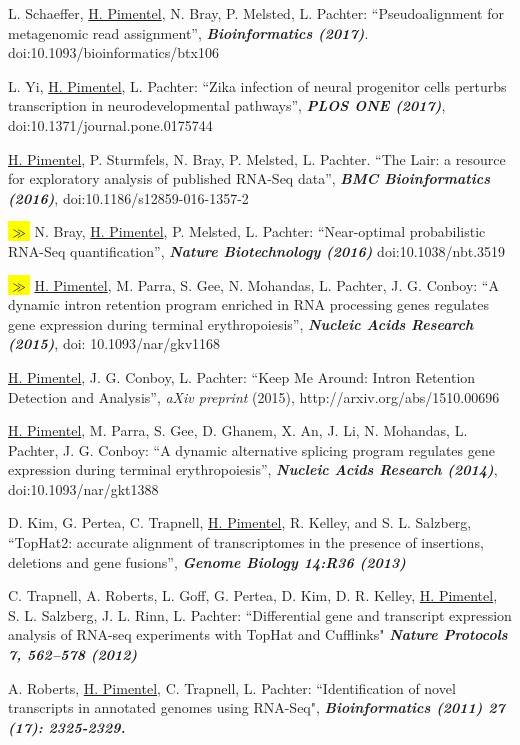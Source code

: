 \documentclass[overlapped]{res}
\newcommand{\hlc}[2][blue]{ {\sethlcolor{#1} \hl{#2}} }
\newcommand{\hlpub}{\hlc[Dandelion]{{\color{white}$\gg$} }}
\begin{document}
\begin{resume}
L. Schaeffer, \underline{H. Pimentel}, N. Bray, P. Melsted, L. Pachter: ``Pseudoalignment for metagenomic read assignment'', {\bf \emph{Bioinformatics (2017)}}. doi:10.1093/bioinformatics/btx106

L. Yi, \underline{H. Pimentel}, L. Pachter: ``Zika infection of neural progenitor cells perturbs transcription in neurodevelopmental pathways'', {\bf \emph{PLOS ONE (2017)}}, doi:10.1371/journal.pone.0175744

\newpage

\underline{H. Pimentel}, P. Sturmfels, N. Bray, P. Melsted, L. Pachter. ``The Lair: a resource for exploratory analysis of published RNA-Seq data'', {\bf \emph{BMC Bioinformatics (2016)}}, doi:10.1186/s12859-016-1357-2

\hlpub N. Bray, \underline{H. Pimentel}, P. Melsted, L. Pachter: ``Near-optimal probabilistic RNA-Seq quantification'', {\bf \emph{Nature Biotechnology (2016)}} doi:10.1038/nbt.3519

\hlpub\underline{H. Pimentel}, M. Parra, S. Gee, N. Mohandas, L. Pachter, J. G. Conboy: ``A dynamic intron retention program enriched in RNA processing genes regulates gene expression during terminal erythropoiesis'', {\bf \emph{Nucleic Acids Research (2015)}}, doi: 10.1093/nar/gkv1168

\underline{H. Pimentel}, J. G. Conboy, L. Pachter: ``Keep Me Around: Intron
Retention Detection and Analysis'', {\emph{aXiv preprint} (2015), http://arxiv.org/abs/1510.00696}

\underline{H. Pimentel}, M. Parra, S. Gee, D. Ghanem, X. An, J. Li, N.
Mohandas, L. Pachter, J. G. Conboy: ``A dynamic alternative splicing program
  regulates gene expression during terminal erythropoiesis'', {\bf \emph{Nucleic
    Acids Research (2014)}}, doi:10.1093/nar/gkt1388

D. Kim, G. Pertea, C. Trapnell, \underline{H. Pimentel}, R. Kelley, and S.
L. Salzberg, ``TopHat2: accurate alignment of transcriptomes in the presence of
insertions, deletions and gene fusions'', {\bf \emph{Genome Biology
    14:R36 (2013)}}

C. Trapnell, A. Roberts, L. Goff, G. Pertea, D. Kim, D. R. Kelley,
\underline{H. Pimentel}, S. L. Salzberg, J. L. Rinn, L. Pachter: ``Differential
gene and transcript expression analysis of RNA-seq experiments with TopHat and
Cufflinks" {\bf \emph{Nature Protocols 7, 562–578 (2012)}}

A. Roberts, \underline{H. Pimentel}, C. Trapnell, L. Pachter: ``Identification
of novel transcripts in annotated genomes using RNA-Seq", {\bf
  \emph{Bioinformatics (2011) 27 (17): 2325-2329.}}


\end{resume}
\end{document}
